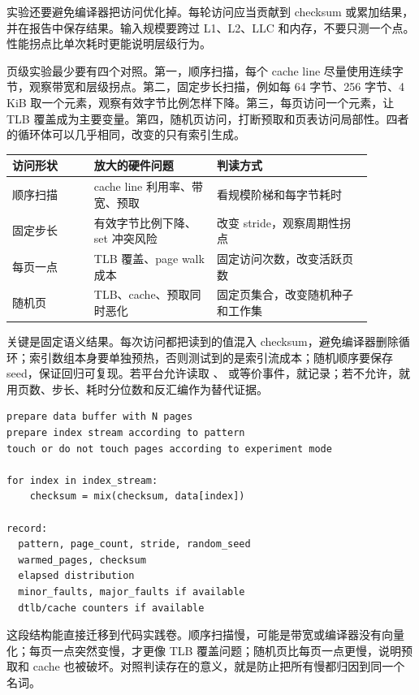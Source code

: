实验还要避免编译器把访问优化掉。每轮访问应当贡献到 checksum 或累加结果，并在报告中保存结果。输入规模要跨过 L1、L2、LLC 和内存，不要只测一个点。性能拐点比单次耗时更能说明层级行为。

页级实验最少要有四个对照。第一，顺序扫描，每个 cache line 尽量使用连续字节，观察带宽和层级拐点。第二，固定步长扫描，例如每 64 字节、256 字节、4 KiB 取一个元素，观察有效字节比例怎样下降。第三，每页访问一个元素，让 TLB 覆盖成为主要变量。第四，随机页访问，打断预取和页表访问局部性。四者的循环体可以几乎相同，改变的只有索引生成。

\begin{center}
\small
\begin{tabular}{@{}p{0.20\linewidth}p{0.30\linewidth}p{0.38\linewidth}@{}}
\toprule
访问形状 & 放大的硬件问题 & 判读方式 \\
\midrule
顺序扫描 & cache line 利用率、带宽、预取 & 看规模阶梯和每字节耗时 \\
固定步长 & 有效字节比例下降、set 冲突风险 & 改变 stride，观察周期性拐点 \\
每页一点 & TLB 覆盖、page walk 成本 & 固定访问次数，改变活跃页数 \\
随机页 & TLB、cache、预取同时恶化 & 固定页集合，改变随机种子和工作集 \\
\bottomrule
\end{tabular}
\end{center}

关键是固定语义结果。每次访问都把读到的值混入 checksum，避免编译器删除循环；索引数组本身要单独预热，否则测试到的是索引流成本；随机顺序要保存 seed，保证回归可复现。若平台允许读取 、 或等价事件，就记录；若不允许，就用页数、步长、耗时分位数和反汇编作为替代证据。

\begin{lstlisting}[numbers=none,caption={页级实验的伪代码结构}]
prepare data buffer with N pages
prepare index stream according to pattern
touch or do not touch pages according to experiment mode

for index in index_stream:
    checksum = mix(checksum, data[index])

record:
  pattern, page_count, stride, random_seed
  warmed_pages, checksum
  elapsed distribution
  minor_faults, major_faults if available
  dtlb/cache counters if available
\end{lstlisting}

这段结构能直接迁移到代码实践卷。顺序扫描慢，可能是带宽或编译器没有向量化；每页一点突然变慢，才更像 TLB 覆盖问题；随机页比每页一点更慢，说明预取和 cache 也被破坏。对照判读存在的意义，就是防止把所有慢都归因到同一个名词。


